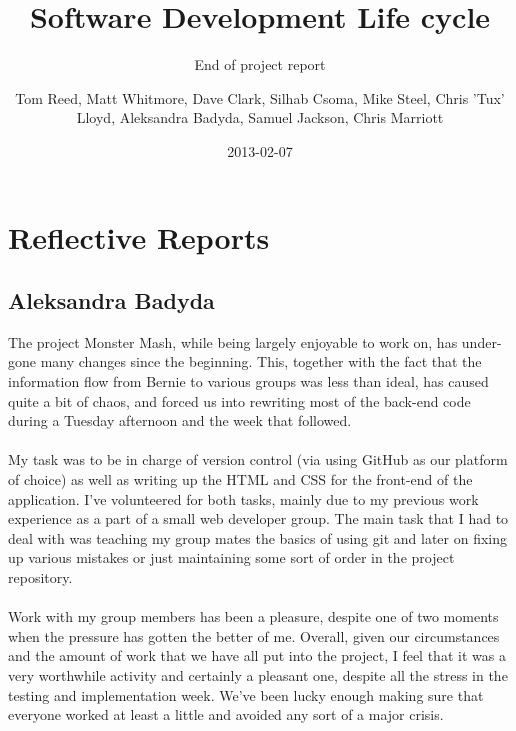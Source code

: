 \documentclass{project}
\begin{document}
\title{Software Development Life cycle}
\subtitle{End of project report}
\author{Tom Reed, Matt Whitmore, Dave Clark, Silhab Csoma, Mike Steel, Chris 'Tux' Lloyd, Aleksandra Badyda, Samuel Jackson, Chris Marriott}
\date{2013-02-07}
\maketitle
\tableofcontents
\newpage









\section{Reflective Reports}
\subsection{Aleksandra Badyda}
The project Monster Mash, while being largely enjoyable to work on, has under-
gone many changes since the beginning. This, together with the fact that the
information flow from Bernie to various groups was less than ideal, has caused
quite a bit of chaos, and forced us into rewriting most of the back-end code
during a Tuesday afternoon and the week that followed.
\\\\
My task was to be in charge of version control (via using GitHub as our platform
of choice) as well as writing up the HTML and CSS for the front-end of the
application. I’ve volunteered for both tasks, mainly due to my previous work
experience as a part of a small web developer group. The main task that I had
to deal with was teaching my group mates the basics of using git and later on
fixing up various mistakes or just maintaining some sort of order in the project
repository.
\\\\
Work with my group members has been a pleasure, despite one of two moments
when the pressure has gotten the better of me. Overall, given our circumstances
and the amount of work that we have all put into the project, I feel that it was
a very worthwhile activity and certainly a pleasant one, despite all the stress
in the testing and implementation week. We’ve been lucky enough making sure
that everyone worked at least a little and avoided any sort of a major crisis.
\end{document}
